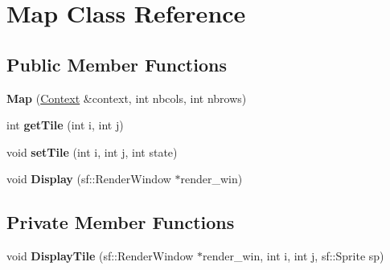 \hypertarget{classMap}{\section{\-Map \-Class \-Reference}
\label{classMap}
}
\subsection*{\-Public \-Member \-Functions}
\begin{DoxyCompactItemize}
\item 
\hypertarget{classMap_a2e5d5887bbcec76bf601b7e531667be1_a2e5d5887bbcec76bf601b7e531667be1}{{\bfseries \-Map} (\hyperlink{classContext}{\-Context} \&context, int nbcols, int nbrows)}\label{classMap_a2e5d5887bbcec76bf601b7e531667be1_a2e5d5887bbcec76bf601b7e531667be1}

\item 
\hypertarget{classMap_ab3c5359d2a854207d0dae015ed1ab8c0_ab3c5359d2a854207d0dae015ed1ab8c0}{int {\bfseries get\-Tile} (int i, int j)}\label{classMap_ab3c5359d2a854207d0dae015ed1ab8c0_ab3c5359d2a854207d0dae015ed1ab8c0}

\item 
\hypertarget{classMap_ad4f7841ff5acdb2bee843a7f77c14254_ad4f7841ff5acdb2bee843a7f77c14254}{void {\bfseries set\-Tile} (int i, int j, int state)}\label{classMap_ad4f7841ff5acdb2bee843a7f77c14254_ad4f7841ff5acdb2bee843a7f77c14254}

\item 
\hypertarget{classMap_a9770d585264af2132c92fc6aad6af755_a9770d585264af2132c92fc6aad6af755}{void {\bfseries \-Display} (sf\-::\-Render\-Window $\ast$render\-\_\-win)}\label{classMap_a9770d585264af2132c92fc6aad6af755_a9770d585264af2132c92fc6aad6af755}

\end{DoxyCompactItemize}
\subsection*{\-Private \-Member \-Functions}
\begin{DoxyCompactItemize}
\item 
\hypertarget{classMap_a360398252d37c9fbb1143d2ab156b9f6_a360398252d37c9fbb1143d2ab156b9f6}{void {\bfseries \-Display\-Tile} (sf\-::\-Render\-Window $\ast$render\-\_\-win, int i, int j, sf\-::\-Sprite sp)}\label{classMap_a360398252d37c9fbb1143d2ab156b9f6_a360398252d37c9fbb1143d2ab156b9f6}

\end{DoxyCompactItemize}
